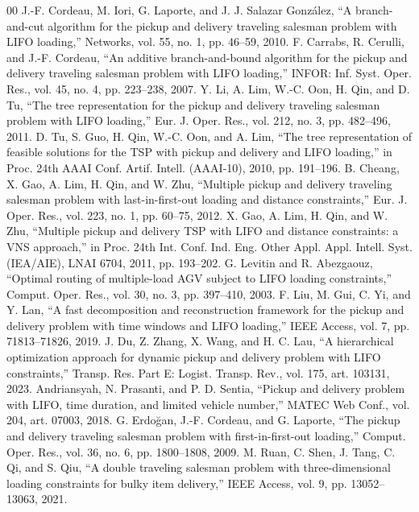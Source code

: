 \documentclass[conference]{IEEEtran}
\begin{document}
\begin{thebibliography}{00}
 J.-F. Cordeau, M. Iori, G. Laporte, and J. J. Salazar González, ``A branch-and-cut algorithm for the pickup and delivery traveling salesman problem with LIFO loading,'' Networks, vol. 55, no. 1, pp. 46--59, 2010.
 F. Carrabs, R. Cerulli, and J.-F. Cordeau, ``An additive branch-and-bound algorithm for the pickup and delivery traveling salesman problem with LIFO loading,'' INFOR: Inf. Syst. Oper. Res., vol. 45, no. 4, pp. 223--238, 2007.
 Y. Li, A. Lim, W.-C. Oon, H. Qin, and D. Tu, ``The tree representation for the pickup and delivery traveling salesman problem with LIFO loading,'' Eur. J. Oper. Res., vol. 212, no. 3, pp. 482--496, 2011.
 D. Tu, S. Guo, H. Qin, W.-C. Oon, and A. Lim, ``The tree representation of feasible solutions for the TSP with pickup and delivery and LIFO loading,'' in Proc. 24th AAAI Conf. Artif. Intell. (AAAI-10), 2010, pp. 191--196.
 B. Cheang, X. Gao, A. Lim, H. Qin, and W. Zhu, ``Multiple pickup and delivery traveling salesman problem with last-in-first-out loading and distance constraints,'' Eur. J. Oper. Res., vol. 223, no. 1, pp. 60--75, 2012.
 X. Gao, A. Lim, H. Qin, and W. Zhu, ``Multiple pickup and delivery TSP with LIFO and distance constraints: a VNS approach,'' in Proc. 24th Int. Conf. Ind. Eng. Other Appl. Appl. Intell. Syst. (IEA/AIE), LNAI 6704, 2011, pp. 193--202.
 G. Levitin and R. Abezgaouz, ``Optimal routing of multiple-load AGV subject to LIFO loading constraints,'' Comput. Oper. Res., vol. 30, no. 3, pp. 397--410, 2003.
 F. Liu, M. Gui, C. Yi, and Y. Lan, ``A fast decomposition and reconstruction framework for the pickup and delivery problem with time windows and LIFO loading,'' IEEE Access, vol. 7, pp. 71813--71826, 2019.
 J. Du, Z. Zhang, X. Wang, and H. C. Lau, ``A hierarchical optimization approach for dynamic pickup and delivery problem with LIFO constraints,'' Transp. Res. Part E: Logist. Transp. Rev., vol. 175, art. 103131, 2023.
 Andriansyah, N. Prasanti, and P. D. Sentia, ``Pickup and delivery problem with LIFO, time duration, and limited vehicle number,'' MATEC Web Conf., vol. 204, art. 07003, 2018.
 G. Erdo\u{g}an, J.-F. Cordeau, and G. Laporte, ``The pickup and delivery traveling salesman problem with first-in-first-out loading,'' Comput. Oper. Res., vol. 36, no. 6, pp. 1800--1808, 2009.
 M. Ruan, C. Shen, J. Tang, C. Qi, and S. Qiu, ``A double traveling salesman problem with three-dimensional loading constraints for bulky item delivery,'' IEEE Access, vol. 9, pp. 13052--13063, 2021.

\end{thebibliography}
\end{document}
